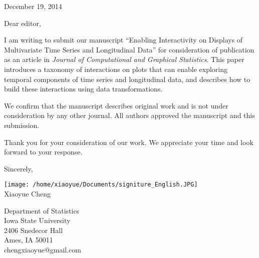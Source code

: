\documentclass[11pt]{article}
\begin{document}
\begin{flushright}
December 19, 2014
\end{flushright}

Dear editor,

I am writing to submit our manuscript ``Enabling Interactivity
on Displays of Multivariate Time Series and Longitudinal Data''
for consideration of publication as an article in \textit{Journal
of Computational and Graphical Statistics}. This paper introduces
a taxonomy of interactions on plots that can enable exploring temporal
components of time series and longitudinal data, and describes how
to build these interactions using data transformations.

We confirm that the manuscript describes original work and is not
under consideration by any other journal. All authors approved the
manuscript and this submission.

Thank you for your consideration of our work. We appreciate your time
and look forward to your response. 

\bigskip{}

Sincerely,

\texttt{[image: /home/xiaoyue/Documents/signiture\_English.JPG]}\\
Xiaoyue Cheng

Department of Statistics\\
Iowa State University\\
2406 Snedecor Hall\\
Ames, IA 50011\\
chengxiaoyue@gmail.com
\end{document}
